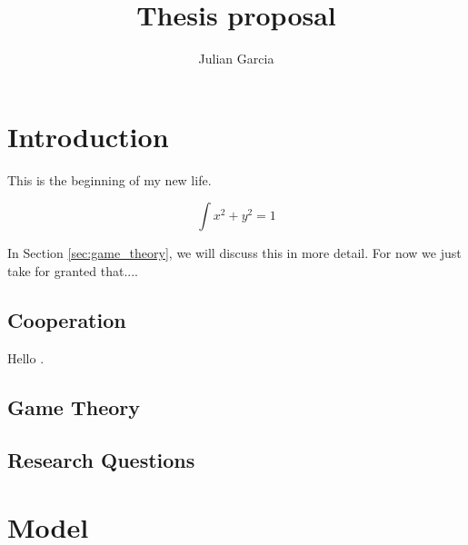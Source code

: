 \documentclass[11pt]{report}
\title{Thesis proposal}
\author{Julian Garcia}
\begin{document}
\maketitle

\chapter{Introduction}

This is the beginning of my new life.

$$\int x^2 + y ^2 = 1$$

In Section \ref{sec:game_theory}, we will discuss this in more detail.
For now we just take for granted that.... 

\section{Cooperation}

Hello \cite{garcia:JTB:2012}.

\section{Game Theory \label{sec:game_theory}}

\section{Research Questions}

\chapter{Model}



\end{document}
